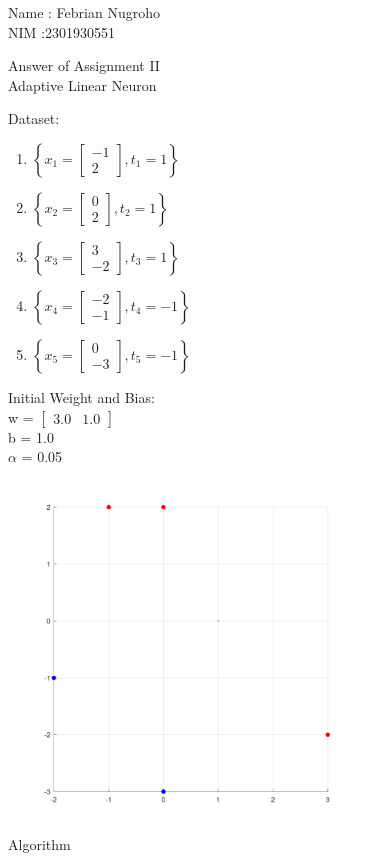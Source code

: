 \documentclass{article}
\begin{document}
	\noindent Name : Febrian Nugroho\\
	NIM :2301930551
	\begin{center}
		\Large Answer of Assignment II\\
		\Large Adaptive Linear Neuron\\
	\end{center}
	\normalsize
	Dataset:
	\begin{enumerate}
		\item $\left\{x_1=\begin{bmatrix}
			-1 \\ 2
		\end{bmatrix}, t_1=1\right\}$
		\item $\left\{x_2=\begin{bmatrix}
			0 \\ 2
		\end{bmatrix}, t_2=1\right\}$
		\item $\left\{x_3=\begin{bmatrix}
			3 \\ -2
		\end{bmatrix}, t_3=1\right\}$
		\item $\left\{x_4=\begin{bmatrix}
			-2 \\ -1
		\end{bmatrix}, t_4=-1\right\}$
		\item $\left\{x_5=\begin{bmatrix}
			0 \\ -3
		\end{bmatrix}, t_5=-1\right\}$
	\end{enumerate}
	Initial Weight and Bias: \\
	w = $\begin{bmatrix}
		3.0 & 1.0
	\end{bmatrix}$ \\
	b = 1.0 \\
	$\alpha$ = 0.05 \\
	\begin{center}
		\includegraphics[width=0.7\textwidth]{initial_plot.png} \\
		\Large Algorithm
	\end{center}
\end{document}

